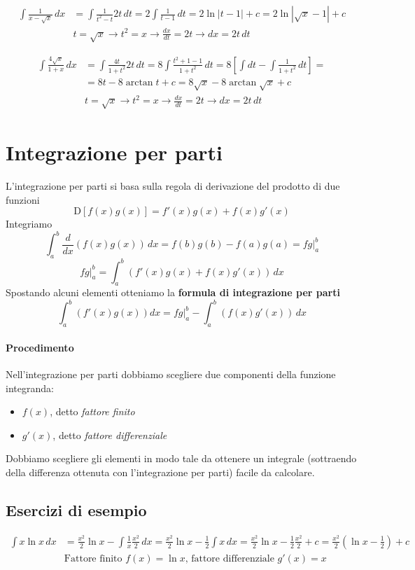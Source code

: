 \documentclass[11pt]{article}
\begin{document}
\begin{align*} \int \frac{1}{x-\sqrt{x}}\,dx&=\int \frac{1}{t^2-t}2t\,dt=2 \int \frac{1}{t-1}\,dt=2 \ln | t-1| +c = 2\ln |\sqrt{x}-1|+c\\&t=\sqrt{x} \longrightarrow \boxed{t^2=x} \longrightarrow \frac{dx}{dt}=2t \longrightarrow \boxed{dx = 2t\,dt}\end{align*}

\begin{align*} \int \frac{4\sqrt{x}}{1+x}\,dx&=\int\frac{4t}{1+t^2}2t\,dt=8 \int \frac{t^2+1-1}{1+t^2}\,dt=8\left[ \int dt - \int \frac{1}{1+t^2}\,dt\right]=\\&=8t-8\arctan t + c=8\sqrt{x}-8\arctan \sqrt{x}+c\\&t=\sqrt{x} \longrightarrow \boxed{t^2=x} \longrightarrow \frac{dx}{dt}=2t\longrightarrow \boxed{dx = 2t\,dt}\end{align*}



\section{Integrazione per parti}
L'integrazione per parti si basa sulla regola di derivazione del prodotto di due funzioni
\[\text{D}\left[f(x)g(x)\right]=f'(x)g(x)+f(x)g'(x)\]
Integriamo
\[\int_a^b \frac{d}{dx}\left(f(x)g(x)\right)\,dx=f(b)g(b)-f(a)g(a)=fg{|}_a^b\]
\[fg{|}_a^b=\int_a^b \left(f'(x)g(x)+f(x)g'(x)\right)\,dx\]
Spostando alcuni elementi otteniamo la \textbf{formula di integrazione per parti}
\large
\[\boxed{\int_a^b\left(f'(x)g(x)\right)dx=fg{|}_a^b-\int_a^b\left(f(x)g'(x)\right)\,dx}\]
\normalsize
\paragraph{Procedimento}
Nell'integrazione per parti dobbiamo scegliere due componenti della funzione integranda:
\begin{itemize}
	\item $f(x)$, detto \emph{fattore finito}
	\item $g'(x)$, detto \emph{fattore differenziale}
\end{itemize}
Dobbiamo scegliere gli elementi in modo tale da ottenere un integrale (sottraendo della differenza ottenuta con l'integrazione per parti) facile da calcolare.
\subsection*{Esercizi di esempio}
\begin{align*}\int x \ln x \,dx&=\frac{x^2}{2} \ln x - \int \frac{1}{x} \frac{x^2}{2}\,dx=\frac{x^2}{2} \ln x-\frac{1}{2}\int x\,dx=\frac{x^2}{2} \ln x-\frac{1}{2}\frac{x^2}{2}+c=\frac{x^2}{2}\left(\ln x- \frac{1}{2}\right)+c\\&\text{Fattore finito $f(x)=\ln x$, fattore differenziale $g'(x)=x$}\end{align*}
\end{document}
